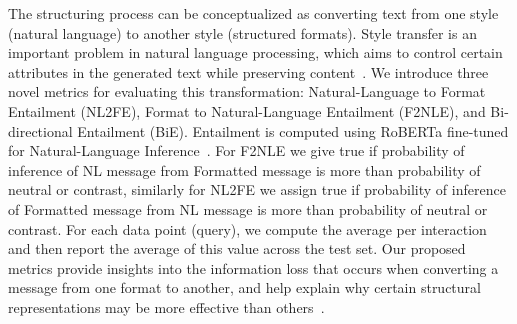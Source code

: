 The structuring process can be conceptualized as converting text from one style (natural language) to another style (structured formats). Style transfer is an important problem in natural language processing, which aims to control certain attributes in the generated text while preserving content~\cite{li2018style,jin2022deep}. We introduce three novel metrics for evaluating this transformation: Natural-Language to Format Entailment (NL2FE), Format to Natural-Language Entailment (F2NLE), and Bi-directional Entailment (BiE). Entailment is computed using RoBERTa fine-tuned for Natural-Language Inference~\cite{liu2019roberta,williams2018broad}. For F2NLE we give true if probability of inference of NL message from Formatted message is more than probability of neutral or contrast, similarly for NL2FE we assign true if probability of inference of Formatted message from NL message is more than probability of neutral or contrast. For each data point (query), we compute the average per interaction and then report the average of this value across the test set. Our proposed metrics provide insights into the information loss that occurs when converting a message from one format to another, and help explain why certain structural representations may be more effective than others~\cite{krishna2020reformulating}.


